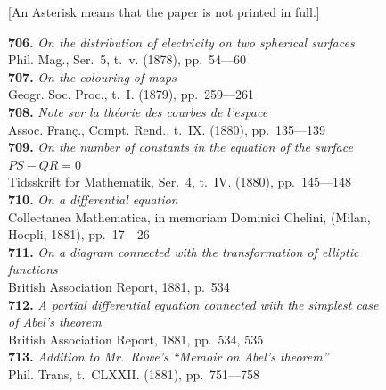 \documentclass[12pt,a4paper,oneside]{book}
\theoremstyle{plain}
\theoremstyle{definition}
\theoremstyle{remark}
\begin{document}
\begin{center}
\small [An Asterisk means that the paper is not printed in full.]
\end{center}

\small
\noindent\textbf{706.} \textit{On the distribution of electricity on two spherical surfaces} \\
\hspace*{2em}Phil. Mag., Ser.~5, t.~v. (1878), pp.~54---60\\[0.3em]
\textbf{707.} \textit{On the colouring of maps} \\
\hspace*{2em}Geogr. Soc. Proc., t.~I. (1879), pp.~259---261\\[0.3em]
\textbf{708.} \textit{Note sur la th\'eorie des courbes de l'espace} \\
\hspace*{2em}Assoc. Fran\c{c}., Compt. Rend., t.~IX. (1880), pp.~135---139\\[0.3em]
\textbf{709.} \textit{On the number of constants in the equation of the surface}\\
\hspace*{2em}$PS - QR = 0$ \\
\hspace*{2em}Tidsskrift for Mathematik, Ser.~4, t.~IV. (1880), pp.~145---148\\[0.3em]
\textbf{710.} \textit{On a differential equation} \\
\hspace*{2em}Collectanea Mathematica, in memoriam Dominici Chelini, (Milan,\\
\hspace*{2em}Hoepli, 1881), pp.~17---26\\[0.3em]
\textbf{711.} \textit{On a diagram connected with the transformation of elliptic}\\
\hspace*{2em}\textit{functions} \\
\hspace*{2em}British Association Report, 1881, p.~534\\[0.3em]
\textbf{712.} \textit{A partial differential equation connected with the simplest case}\\
\hspace*{2em}\textit{of Abel's theorem} \\
\hspace*{2em}British Association Report, 1881, pp.~534, 535\\[0.3em]
\textbf{713.} \textit{Addition to Mr.~Rowe's ``Memoir on Abel's theorem''} \\
\hspace*{2em}Phil. Trans, t.~CLXXII. (1881), pp.~751---758
\end{document}
